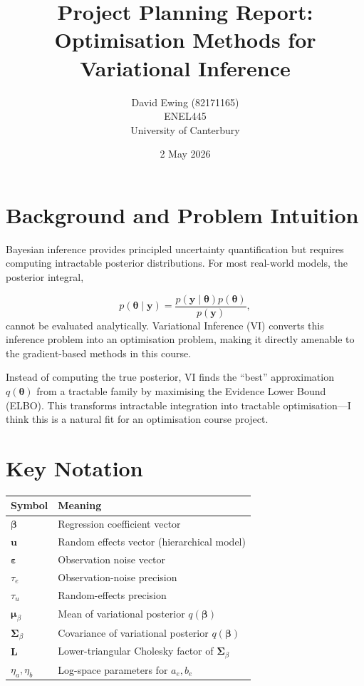 \documentclass[11pt]{article}
\title{Project Planning Report:\\
Optimisation Methods for Variational Inference}
\author{David Ewing (82171165)\\
ENEL445  \\
University of Canterbury}
\date{2 May 2026}
\begin{document}
\maketitle

\section*{Background and Problem Intuition}

Bayesian inference provides principled uncertainty quantification but requires computing intractable posterior distributions. For most real-world models, the posterior integral,

\begin{equation*}
    p(\bm{\theta} \mid \bm{y}) = \frac{p(\bm{y} \mid \bm{\theta})p(\bm{\theta})}{p(\bm{y})},
\end{equation*}
\noindent 
cannot be evaluated analytically. Variational Inference (VI) converts this inference problem into an optimisation problem, making it directly amenable to the gradient-based methods in this course. \vspace{2em}

Instead of computing the true posterior, VI finds the ``best'' approximation $q(\bm{\theta})$ from a tractable family by maximising the Evidence Lower Bound (ELBO). This transforms intractable integration into tractable optimisation---I think this is a natural fit for an optimisation course project.

\section*{Key Notation}

\begin{center}
\begin{tabular}{ll}
\hline
Symbol & Meaning \\
\hline
$\bm{\beta}$ & Regression coefficient vector \\
$\bm{u}$ & Random effects vector (hierarchical model) \\
$\bm{\varepsilon}$ & Observation noise vector \\
$\tau_e$ & Observation-noise precision \\
$\tau_u$ & Random-effects precision \\
$\bm{\mu}_\beta$ & Mean of variational posterior $q(\bm{\beta})$ \\
$\bm{\Sigma}_\beta$ & Covariance of variational posterior $q(\bm{\beta})$ \\
$\bm{L}$ & Lower-triangular Cholesky factor of $\bm{\Sigma}_\beta$ \\
$\eta_a, \eta_b$ & Log-space parameters for $a_e, b_e$ \\
\hline
\end{tabular}
\end{center}
\newpage
\end{document}

